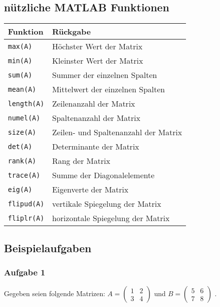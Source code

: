         \subsection{nützliche MATLAB Funktionen}
        \renewcommand{\arraystretch}{1.4}
        \begin{tabularx}{\textwidth}{|X|X|}
            \hline
            \textbf{Funktion} & \textbf{Rückgabe} \\
            \hline
            \texttt{max(A)} & Höchster Wert der Matrix\\
            \hline
            \texttt{min(A)} & Kleinster Wert der Matrix \\
            \hline
            \texttt{sum(A)} & Summer der einzelnen Spalten \\
            \hline
            \texttt{mean(A)} & Mittelwert der einzelnen Spalten \\
            \hline
            \texttt{length(A)} & Zeilenanzahl der Matrix \\
            \hline
            \texttt{numel(A)} & Spaltenanzahl der Matrix \\
            \hline
            \texttt{size(A)} & Zeilen- und Spaltenanzahl der Matrix \\
            \hline
            \texttt{det(A)} & Determinante der Matrix \\
            \hline
            \texttt{rank(A)} & Rang der Matrix \\
            \hline
            \texttt{trace(A)} & Summe der Diagonalelemente \\
            \hline
            \texttt{eig(A)} & Eigenverte der Matrix \\
            \hline
            \texttt{flipud(A)} & vertikale Spiegelung der Matrix \\
            \hline
            \texttt{fliplr(A)} & horizontale Spiegelung der Matrix \\
            \hline
        \end{tabularx}
        \subsection{Beispielaufgaben}
            \subsubsection*{Aufgabe 1}
            Gegeben seien folgende Matrizen:
            \begin{math}
                A = \begin{pmatrix}
                    1 & 2 \\
                    3 & 4
                \end{pmatrix}
            \end{math}
            und 
            \begin{math}
                B = \begin{pmatrix}
                    5 & 6 \\
                    7 & 8
                \end{pmatrix}
            \end{math}
            .\\

